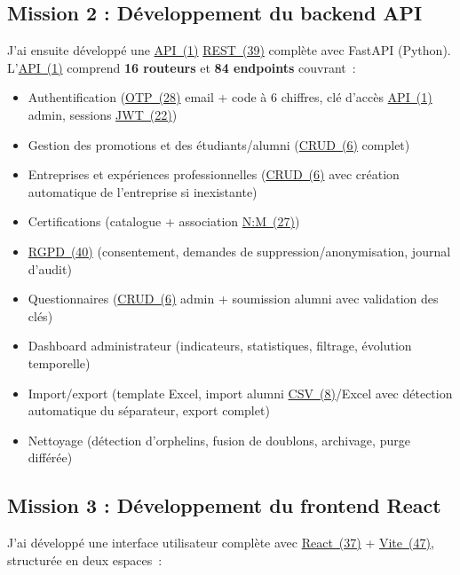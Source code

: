 \documentclass[12pt,a4paper]{report}
\begin{document}
\subsection{Mission 2 : Développement du backend API}

J'ai ensuite développé une \hyperlink{abbr-API}{API~(1)} \hyperlink{abbr-REST}{REST~(39)} complète avec FastAPI (Python). L'\hyperlink{abbr-API}{API~(1)} comprend \textbf{16 routeurs} et \textbf{84 endpoints} couvrant~:

\begin{itemize}
  \item Authentification (\hyperlink{abbr-OTP}{OTP~(28)} email + code à 6 chiffres, clé d'accès \hyperlink{abbr-API}{API~(1)} admin, sessions \hyperlink{abbr-JWT}{JWT~(22)})
  \item Gestion des promotions et des étudiants/alumni (\hyperlink{abbr-CRUD}{CRUD~(6)} complet)
  \item Entreprises et expériences professionnelles (\hyperlink{abbr-CRUD}{CRUD~(6)} avec création automatique de l'entreprise si inexistante)
  \item Certifications (catalogue + association \hyperlink{abbr-NM}{N:M~(27)})
  \item \hyperlink{abbr-RGPD}{RGPD~(40)} (consentement, demandes de suppression/anonymisation, journal d'audit)
  \item Questionnaires (\hyperlink{abbr-CRUD}{CRUD~(6)} admin + soumission alumni avec validation des clés)
  \item Dashboard administrateur (indicateurs, statistiques, filtrage, évolution temporelle)
  \item Import/export (template Excel, import alumni \hyperlink{abbr-CSV}{CSV~(8)}/Excel avec détection automatique du séparateur, export complet)
  \item Nettoyage (détection d'orphelins, fusion de doublons, archivage, purge différée)
\end{itemize}

\subsection{Mission 3 : Développement du frontend React}

J'ai développé une interface utilisateur complète avec \hyperlink{abbr-React}{React~(37)} + \hyperlink{abbr-Vite}{Vite~(47)}, structurée en deux espaces~:
\end{document}
